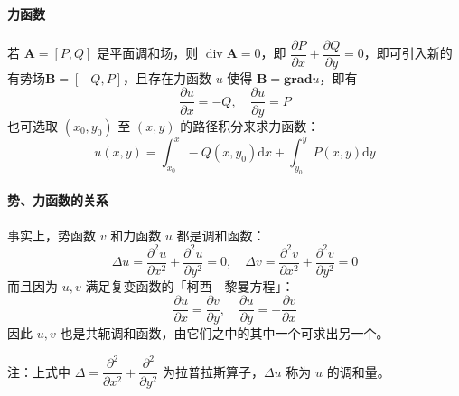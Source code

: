 \documentclass[UTF8]{ctexart}
\renewcommand\d{\mathrm{d}}
\newcommand\A{\boldsymbol{A}}
\newcommand\grad{\mathbf{grad}}
\renewcommand\div{\operatorname{div}} %
\begin{document}
\paragraph{力函数} 若 $\A=[P,Q]$ 是平面调和场，则 $\div\A=0$，即 $\dfrac{\partial P}{\partial x} + \dfrac{\partial Q}{\partial y} = 0$，即可引入新的有势场\underline{$\boldsymbol B = [-Q,P]$}，且存在力函数 $u$ 使得 $\boldsymbol B=\grad u$，即有
\begin{equation}
    \dfrac{\partial u}{\partial x}=-Q,\quad \dfrac{\partial u}{\partial y}=P
\end{equation}
也可选取 $(x_0,y_0)$ 至 $(x,y)$ 的路径积分来求力函数：
\begin{equation*}
    u(x,y) = \int_{x_0}^x -Q(x,y_0)\d x + \int_{y_0}^y P(x,y)\d y
\end{equation*}

\paragraph{势、力函数的关系} 事实上，势函数 $v$ 和力函数 $u$ 都是调和函数：
\begin{equation*}
    \Delta u = \dfrac{\partial^2 u}{\partial x^2} + \dfrac{\partial^2 u}{\partial y^2} = 0,\quad \Delta v = \dfrac{\partial^2 v}{\partial x^2} + \dfrac{\partial^2 v}{\partial y^2}=0
\end{equation*}
而且因为 $u,v$ 满足复变函数的「柯西—黎曼方程」：
\begin{equation*}
    \dfrac{\partial u}{\partial x} = \dfrac{\partial v}{\partial y},\quad \dfrac{\partial u}{\partial y}= -\dfrac{\partial v}{\partial x}
\end{equation*}
因此 $u,v$ 也是共轭调和函数，由它们之中的其中一个可求出另一个。

注：上式中 $\Delta=\dfrac{\partial^2}{\partial x^2} + \dfrac{\partial^2}{\partial y^2}$ 为拉普拉斯算子，$\Delta u$ 称为 $u$ 的调和量。
\end{document}
